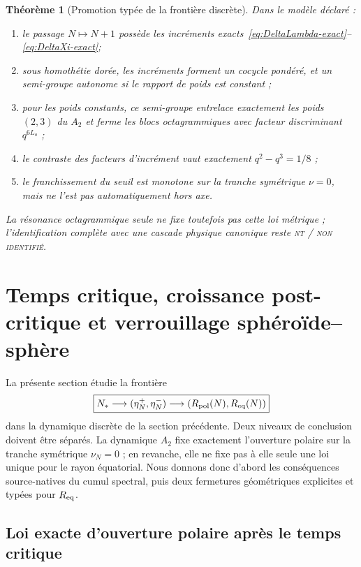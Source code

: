 \documentclass[11pt,a4paper]{article}
\newtheorem{theorem}{Théorème}[section]
\newcommand{\statusNT}{\textsc{nt / non identifié}}
\begin{document}
\begin{theorem}[Promotion typée de la frontière discrète]\label{thm:promotion-v7}
Dans le modèle déclaré :
\begin{enumerate}[label=\textup{(\roman*)}]
\item le passage $N\mapsto N+1$ possède les incréments exacts~\eqref{eq:DeltaLambda-exact}--\eqref{eq:DeltaXi-exact};
\item sous homothétie dorée, les incréments forment un cocycle pondéré, et un semi-groupe autonome si le rapport de poids est constant ;
\item pour les poids constants, ce semi-groupe entrelace exactement les poids $(2,3)$ du $A_2$ et ferme les blocs octagrammiques avec facteur discriminant $q^{6L_o}$ ;
\item le contraste des facteurs d'incrément vaut exactement $q^2-q^3=1/8$ ;
\item le franchissement du seuil est monotone sur la tranche symétrique $\nu=0$, mais ne l'est pas automatiquement hors axe.
\end{enumerate}
La résonance octagrammique seule ne fixe toutefois pas cette loi métrique ; l'identification complète avec une cascade physique canonique reste \statusNT{}.
\end{theorem}



\section{Temps critique, croissance post-critique et verrouillage sphéroïde--sphère}\label{sec:postcritical-lock}

La présente section étudie la frontière
\[
 \boxed{
 N_*
 \longrightarrow
 (\eta_N^+,\eta_N^-)
 \longrightarrow
 (R_{\rm pol}(N),R_{\rm eq}(N))
 }
\]
dans la dynamique discrète de la section précédente. Deux niveaux de conclusion doivent être séparés. La dynamique $A_2$ fixe exactement l'ouverture polaire sur la tranche symétrique $\nu_N=0$ ; en revanche, elle ne fixe pas à elle seule une loi unique pour le rayon équatorial. Nous donnons donc d'abord les conséquences source-natives du cumul spectral, puis deux fermetures géométriques explicites et typées pour $R_{\rm eq}$.

\subsection{Loi exacte d'ouverture polaire après le temps critique}
\end{document}
